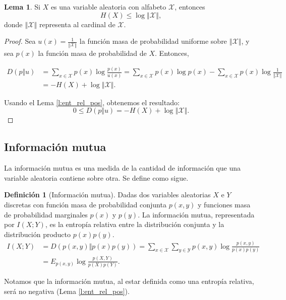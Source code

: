 \documentclass[10pt,a4paper]{article} %
\theoremstyle{definition}
\newtheorem{definition}{Definición}[section]
\newtheorem{lemma}[theorem]{Lema}
\begin{document}
\begin{lemma}
  Si $X$ es una variable aleatoria con alfabeto $\mathcal{X}$, entonces \[
  H(X) \leq \log{\left\Vert\mathcal{X}\right\Vert}, 
  \]
donde $\left\Vert\mathcal{X}\right\Vert$ representa al cardinal de $\mathcal{X}$.
\end{lemma}
\begin{proof}
  Sea $u(x) = \frac{1}{\left\Vert\mathcal{X}\right\Vert}$ la función masa de probabilidad uniforme sobre $\left\Vert\mathcal{X}\right\Vert$, y sea $p(x)$ la función masa de probabilidad de $X$. Entonces,
  
 \begin{align*}
   D \left ( p \Vert u \right ) &= \sum_{x \in \mathcal{X}}
   p(x) \log \frac{p(x)}{u(x)} = \sum_{x \in \mathcal{X}} p(x) \log p(x) - \sum_{x \in \mathcal{X}} p(x) \log \frac{1}{\left\Vert\mathcal{X}\right\Vert}\\
  &= -H(X) + \log \left\Vert\mathcal{X}\right\Vert.
 \end{align*}
 
    Usando el Lema \ref{l:ent_rel_pos}, obtenemos el resultado: \[
0 \leq D\left ( p \Vert u \right ) = -H(X) + \log \left\Vert\mathcal{X}\right\Vert.
    \]
\end{proof}

\subsection{Información mutua}

La información mutua es una medida de la cantidad de información que una variable aleatoria contiene sobre otra. Se define como sigue.

\begin{definition}[Información mutua]
  Dadas dos variables aleatorias $X$ e $Y$ discretas con función masa de probabilidad conjunta $p(x,y)$ y funciones masa de probabilidad marginales $p(x)$ y $p(y)$. La información mutua, representada por $I(X;Y)$, es la entropía relativa entre la distribución conjunta y la distribución producto $p(x)p(y)$.
  \begin{align*}
  I(X;Y) &= D \left ( p(x,y) \Vert p(x)p(y) \right ) = \sum_{x \in \mathcal{X}}\sum_{y \in \mathcal{Y}} p(x,y) \log \frac{p(x,y)}{p(x)p(y)}\\ &= E_{p(x,y)} \log \frac{p(X,Y)}{p(X)p(Y)}.
  \end{align*}
\end{definition}

Notamos que la información mutua, al estar definida como una entropía relativa, será no negativa (Lema \ref{l:ent_rel_pos}).
\end{document}
